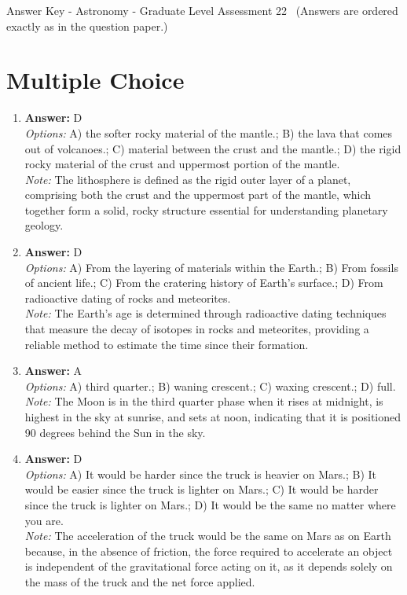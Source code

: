 \documentclass[12pt]{article}
\begin{document}
\begin{center}
Answer Key - Astronomy - Graduate Level Assessment 22 \
\small (Answers are ordered exactly as in the question paper.)
\end{center}

\section*{Multiple Choice}
\begin{enumerate}[label=\arabic*.]
\item \textbf{Answer:} D
\\ \textit{Options:} A) the softer rocky material of the mantle.; B) the lava that comes out of volcanoes.; C) material between the crust and the mantle.; D) the rigid rocky material of the crust and uppermost portion of the mantle.
\\ \textit{Note:} The lithosphere is defined as the rigid outer layer of a planet, comprising both the crust and the uppermost part of the mantle, which together form a solid, rocky structure essential for understanding planetary geology.
\item \textbf{Answer:} D
\\ \textit{Options:} A) From the layering of materials within the Earth.; B) From fossils of ancient life.; C) From the cratering history of Earth's surface.; D) From radioactive dating of rocks and meteorites.
\\ \textit{Note:} The Earth's age is determined through radioactive dating techniques that measure the decay of isotopes in rocks and meteorites, providing a reliable method to estimate the time since their formation.
\item \textbf{Answer:} A
\\ \textit{Options:} A) third quarter.; B) waning crescent.; C) waxing crescent.; D) full.
\\ \textit{Note:} The Moon is in the third quarter phase when it rises at midnight, is highest in the sky at sunrise, and sets at noon, indicating that it is positioned 90 degrees behind the Sun in the sky.
\item \textbf{Answer:} D
\\ \textit{Options:} A) It would be harder since the truck is heavier on Mars.; B) It would be easier since the truck is lighter on Mars.; C) It would be harder since the truck is lighter on Mars.; D) It would be the same no matter where you are.
\\ \textit{Note:} The acceleration of the truck would be the same on Mars as on Earth because, in the absence of friction, the force required to accelerate an object is independent of the gravitational force acting on it, as it depends solely on the mass of the truck and the net force applied.

\end{enumerate}
\end{document}
